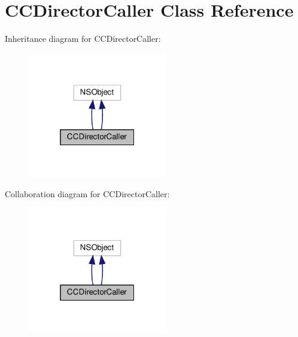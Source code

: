 \hypertarget{interfaceCCDirectorCaller}{}\section{C\+C\+Director\+Caller Class Reference}
\label{interfaceCCDirectorCaller}


Inheritance diagram for C\+C\+Director\+Caller\+:
\nopagebreak
\begin{figure}[H]
\begin{center}
\leavevmode
\includegraphics[width=172pt]{interfaceCCDirectorCaller__inherit__graph}
\end{center}
\end{figure}


Collaboration diagram for C\+C\+Director\+Caller\+:
\nopagebreak
\begin{figure}[H]
\begin{center}
\leavevmode
\includegraphics[width=172pt]{interfaceCCDirectorCaller__coll__graph}
\end{center}
\end{figure}
